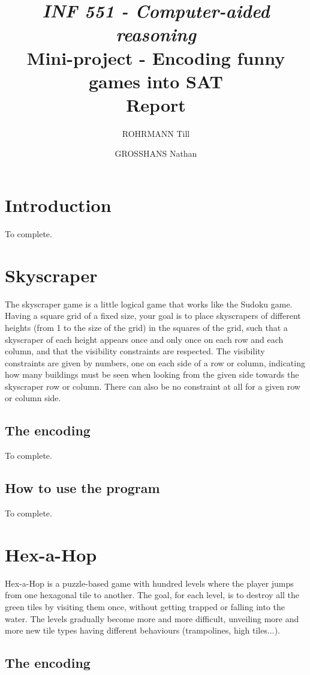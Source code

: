 \documentclass[a4paper, 12pt, titlepage]{article}
\title
{{\em INF 551 - Computer-aided reasoning}\\
Mini-project - Encoding funny games into SAT\\
{\bf Report}}
\author{ROHRMANN Till \and GROSSHANS Nathan}
\date{}
\begin{document}
\maketitle


\section{Introduction}
To complete.


\section{Skyscraper}
The skyscraper game is a little logical game that works like the Sudoku game.
Having a square grid of a fixed size, your goal is to place skyscrapers of
different heights (from 1 to the size of the grid) in the squares of the grid,
such that a skyscraper of each height appears once and only once on each row and
each column, and that the visibility constraints are respected. The visibility
constraints are given by numbers, one on each side of a row or column,
indicating how many buildings must be seen when looking from the given side
towards the skyscraper row or column. There can also be no constraint at all for
a given row or column side.

\subsection{The encoding}
To complete.

\subsection{How to use the program}
To complete.


\section{Hex-a-Hop}
Hex-a-Hop is a puzzle-based game with hundred levels where the player jumps from
one hexagonal tile to another. The goal, for each level, is to destroy all the
green tiles by visiting them once, without getting trapped or falling into the
water. The levels gradually become more and more difficult, unveiling more and
more new tile types having different behaviours (trampolines, high tiles...).

\subsection{The encoding}
\end{document}
